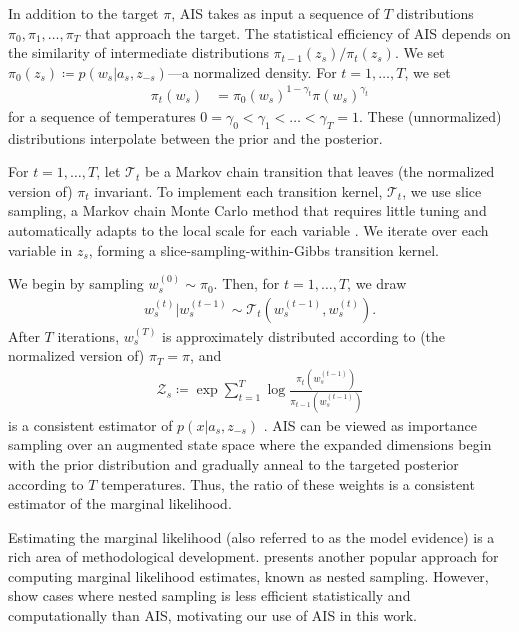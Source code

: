 In addition to the target $\pi$, AIS takes as input a sequence of $T$ distributions
$\pi_0, \pi_1, \dots, \pi_T$ that approach the target.
The statistical efficiency of AIS depends on the similarity of intermediate distributions $\pi_{t-1}(z_s) / \pi_{t}(z_s)$.
We set $\pi_0(z_s) \coloneqq p(w_s | a_s, z_{-s})$---a normalized density.
For $t=1,\ldots,T$, we set
\begin{align}
  \pi_t(w_s) &= \pi_0(w_s)^{1-\gamma_t} \pi(w_s)^{\gamma_t}
\end{align}
for a sequence of temperatures $0 = \gamma_0 < \gamma_1 < \dots < \gamma_T = 1$.
These (unnormalized) distributions interpolate between the prior and the posterior.

For $t=1, \dots, T$, let $\mathcal T_t$ be a Markov chain transition that leaves (the normalized version of) $\pi_t$ invariant.
To implement each transition kernel, $\mathcal{T}_t$, we use slice sampling, a Markov chain Monte Carlo method that requires little tuning and automatically adapts to the local scale for each variable \citep{neal2003slice}.
We iterate over each variable in $z_s$, forming a slice-sampling-within-Gibbs transition kernel.

We begin by sampling $w_s^{(0)} \sim \pi_0$.
Then, for $t=1, \dots, T$, we draw
\begin{align}
w_s^{(t)} | w_s^{(t-1)} \sim \mathcal{T}_t(w_s^{(t-1)}, w_s^{(t)}).
\end{align}
After $T$ iterations, $w_s^{(T)}$ is approximately distributed according to (the normalized version of) $\pi_T = \pi$, and
\begin{align}
	\mathcal Z_s \coloneqq \exp \sum_{t=1}^T \log \frac{\pi_{t}(w_s^{(t-1)})} { \pi_{t-1}(w_s^{(t-1)}) }
\end{align}
is a consistent estimator of $p(x | a_s, z_{-s})$ \citep{neal2001annealed}.
AIS can be viewed as importance sampling over an augmented state space where the expanded dimensions begin with the prior distribution and gradually anneal to the targeted posterior according to $T$ temperatures.
Thus, the ratio of these weights is a consistent estimator of the marginal likelihood.

Estimating the marginal likelihood (also referred to as the model evidence) is a rich area of methodological development. \cite{skilling2004nested} presents another popular approach for computing marginal likelihood estimates, known as nested sampling.  However, \cite{friel2012estimating} show cases where nested sampling is less efficient statistically and computationally than AIS, motivating our use of AIS in this work.

